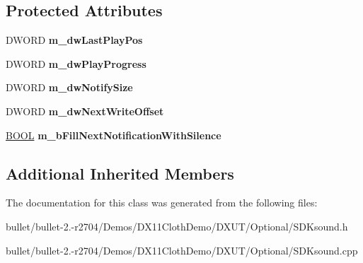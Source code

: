 \subsection*{Protected Attributes}
\begin{DoxyCompactItemize}
\item 
\hypertarget{class_c_streaming_sound_a3f94f44e925644eeb62452486cd02426}{D\+W\+O\+R\+D {\bfseries m\+\_\+dw\+Last\+Play\+Pos}}\label{class_c_streaming_sound_a3f94f44e925644eeb62452486cd02426}

\item 
\hypertarget{class_c_streaming_sound_a35cb3a07748cac48d75cef69ceafa476}{D\+W\+O\+R\+D {\bfseries m\+\_\+dw\+Play\+Progress}}\label{class_c_streaming_sound_a35cb3a07748cac48d75cef69ceafa476}

\item 
\hypertarget{class_c_streaming_sound_a073ea54d4aa5ade06dd00f75cb0e07cd}{D\+W\+O\+R\+D {\bfseries m\+\_\+dw\+Notify\+Size}}\label{class_c_streaming_sound_a073ea54d4aa5ade06dd00f75cb0e07cd}

\item 
\hypertarget{class_c_streaming_sound_a89acb4aad3668f834de1839c3a392862}{D\+W\+O\+R\+D {\bfseries m\+\_\+dw\+Next\+Write\+Offset}}\label{class_c_streaming_sound_a89acb4aad3668f834de1839c3a392862}

\item 
\hypertarget{class_c_streaming_sound_ab229235758b70b36c2e1aeb3d877678c}{\hyperlink{_ice_types_8h_a050c65e107f0c828f856a231f4b4e788}{B\+O\+O\+L} {\bfseries m\+\_\+b\+Fill\+Next\+Notification\+With\+Silence}}\label{class_c_streaming_sound_ab229235758b70b36c2e1aeb3d877678c}

\end{DoxyCompactItemize}
\subsection*{Additional Inherited Members}


The documentation for this class was generated from the following files\+:\begin{DoxyCompactItemize}
\item 
bullet/bullet-\/2.-\/r2704/\+Demos/\+D\+X11\+Cloth\+Demo/\+D\+X\+U\+T/\+Optional/S\+D\+Ksound.\+h\item 
bullet/bullet-\/2.-\/r2704/\+Demos/\+D\+X11\+Cloth\+Demo/\+D\+X\+U\+T/\+Optional/S\+D\+Ksound.\+cpp\end{DoxyCompactItemize}

